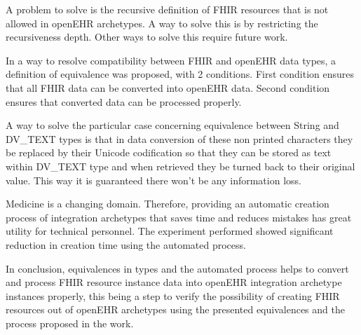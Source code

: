 A problem to solve is the recursive definition of FHIR resources that is not allowed in openEHR archetypes. A way to solve this is by restricting the recursiveness depth. Other ways to solve this require future work.

In a way to resolve compatibility between FHIR and openEHR data types, a definition of equivalence was proposed, with 2 conditions. First condition ensures that all FHIR data can be converted into openEHR data. Second condition ensures that converted data can be processed properly.

A way to solve the particular case concerning equivalence between String and DV\_TEXT types is that in data conversion of these non printed characters they be replaced by their Unicode codification so that they can be stored as text within DV\_TEXT type and when retrieved they be turned back to their original value. This way it is guaranteed there won’t be any information loss.

Medicine is a changing domain. Therefore, providing an automatic creation process of integration archetypes that saves time and reduces mistakes has great utility for technical personnel. The experiment performed showed significant reduction in creation time using the automated process.

In conclusion, equivalences in types and the automated process helps to convert and process FHIR resource instance data into openEHR integration archetype instances properly, this being a step to verify the possibility of creating FHIR resources out of openEHR archetypes using the presented equivalences and the process proposed in the work.
